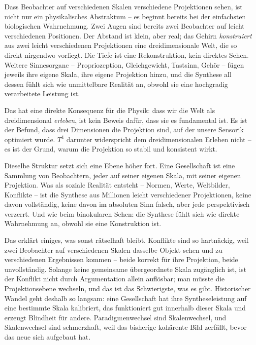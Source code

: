 Dass Beobachter auf verschiedenen Skalen verschiedene Projektionen sehen,
ist nicht nur ein physikalisches Abstraktum -- es beginnt bereits bei der
einfachsten biologischen Wahrnehmung. Zwei Augen sind bereits zwei
Beobachter auf leicht verschiedenen Positionen. Der Abstand ist klein, aber
real; das Gehirn \emph{konstruiert} aus zwei leicht verschiedenen
Projektionen eine dreidimensionale Welt, die so direkt nirgendwo vorliegt.
Die Tiefe ist eine Rekonstruktion, kein direktes Sehen. Weitere
Sinnesorgane -- Propriozeption, Gleichgewicht, Tastsinn, Gehör -- fügen
jeweils ihre eigene Skala, ihre eigene Projektion hinzu, und die Synthese
all dessen fühlt sich wie unmittelbare Realität an, obwohl sie eine
hochgradig verarbeitete Leistung ist.

Das hat eine direkte Konsequenz für die Physik: dass wir die Welt als
dreidimensional \emph{erleben}, ist kein Beweis dafür, dass sie es
fundamental ist. Es ist der Befund, dass drei Dimensionen die Projektion
sind, auf der unsere Sensorik optimiert wurde. $T^4$ darunter widerspricht
dem dreidimensionalen Erleben nicht -- es ist der Grund, warum die
Projektion so stabil und konsistent wirkt.

Dieselbe Struktur setzt sich eine Ebene höher fort. Eine Gesellschaft ist
eine Sammlung von Beobachtern, jeder auf seiner eigenen Skala, mit seiner
eigenen Projektion. Was als soziale Realität entsteht -- Normen, Werte,
Weltbilder, Konflikte -- ist die Synthese aus Millionen leicht verschiedener
Projektionen, keine davon vollständig, keine davon im absoluten Sinn falsch,
aber jede perspektivisch verzerrt. Und wie beim binokularen Sehen: die
Synthese fühlt sich wie direkte Wahrnehmung an, obwohl sie eine Konstruktion
ist.

Das erklärt einiges, was sonst rätselhaft bleibt. Konflikte sind so
hartnäckig, weil zwei Beobachter auf verschiedenen Skalen dasselbe Objekt
sehen und zu verschiedenen Ergebnissen kommen -- beide korrekt für ihre
Projektion, beide unvollständig. Solange keine gemeinsame übergeordnete
Skala zugänglich ist, ist der Konflikt nicht durch Argumentation allein
auflösbar; man müsste die Projektionsebene wechseln, und das ist das
Schwierigste, was es gibt. Historischer Wandel geht deshalb so langsam: eine
Gesellschaft hat ihre Syntheseleistung auf eine bestimmte Skala kalibriert,
das funktioniert gut innerhalb dieser Skala und erzeugt Blindheit für andere.
Paradigmenwechsel sind Skalenwechsel, und Skalenwechsel sind schmerzhaft,
weil das bisherige kohärente Bild zerfällt, bevor das neue sich aufgebaut
hat.

